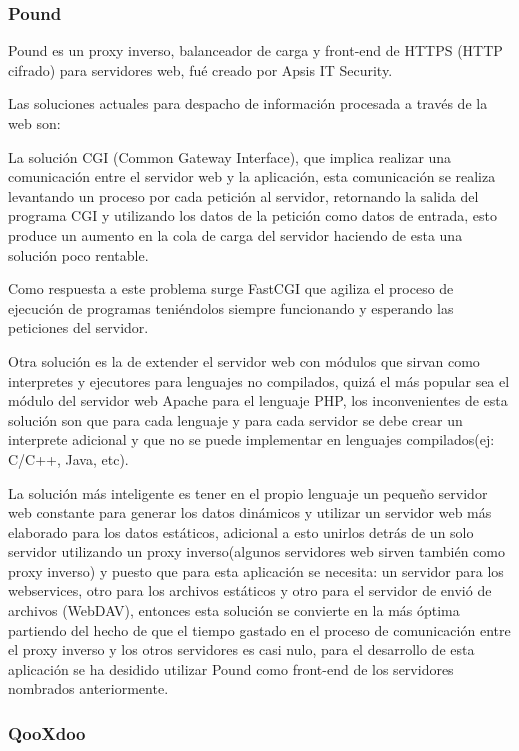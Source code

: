 \subsubsection{Pound}
\label{tec:pound}

Pound \cite{pound} es un proxy inverso, balanceador de carga y front-end de HTTPS (HTTP cifrado) para servidores web, fué creado por Apsis IT Security.

Las soluciones actuales para despacho de información procesada a través de la web son:

La solución CGI (Common Gateway Interface), que implica realizar una comunicación entre el servidor web y la aplicación, esta comunicación se realiza levantando un proceso por cada petición al servidor, retornando la salida del programa CGI y utilizando los datos de la petición como datos de entrada, esto produce un aumento en la cola de carga del servidor haciendo de esta una solución poco rentable.

Como respuesta a este problema surge FastCGI que agiliza el proceso de ejecución de programas teniéndolos siempre funcionando y esperando las peticiones del servidor.

Otra solución es la de extender el servidor web con módulos que sirvan como interpretes y ejecutores para lenguajes no compilados, quizá el más popular sea el módulo del servidor web Apache para el lenguaje PHP, los inconvenientes de esta solución son que para cada lenguaje y para cada servidor se debe crear un interprete adicional y que no se puede implementar en lenguajes compilados(ej: C/C++, Java, etc).

La solución más inteligente es tener en el propio lenguaje un pequeño servidor web constante para generar los datos dinámicos y utilizar un servidor web más elaborado para los datos estáticos, adicional a esto unirlos detrás de un solo servidor utilizando un proxy inverso(algunos servidores web sirven también como proxy inverso) y puesto que para esta aplicación se necesita: un servidor para los webservices, otro para los archivos estáticos y otro para el servidor de envió de archivos (WebDAV), entonces esta solución se convierte en la más óptima partiendo del hecho de que el tiempo gastado en el proceso de comunicación entre el proxy inverso y los otros servidores es casi nulo, para el desarrollo de esta aplicación se ha desidido utilizar Pound como front-end de los servidores nombrados anteriormente.


\subsubsection{QooXdoo \cite{qooxdoo} }
\label{tec:qooxdoo}

